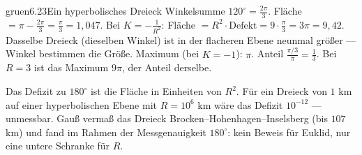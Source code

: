 \begin{loesungkarte}{gruen}{6.23}{Ein hyperbolisches Dreieck}
Winkelsumme $120^{\circ} = \frac{2\pi}3$. Fläche $= \pi - \frac{2\pi}3 = \frac\pi3 = 1{,}047$.
Bei $K = -\frac1{R^{2}}$: Fläche $= R^{2}\cdot\text{Defekt} = 9\cdot\frac\pi3 = 3\pi = 9{,}42$. Dasselbe Dreieck (dieselben Winkel) ist in der flacheren Ebene neunmal größer --- Winkel bestimmen die Größe.
Maximum (bei $K = -1$): $\pi$. Anteil $\frac{\pi/3}\pi = \frac13$. Bei $R = 3$ ist das Maximum $9\pi$, der Anteil derselbe.
\begin{mitnehmen}\kastentext
Das Defizit zu $180^{\circ}$ ist die Fläche in Einheiten von $R^{2}$. Für ein Dreieck von $1$ km auf einer hyperbolischen Ebene mit $R = 10^{6}$ km wäre das Defizit $10^{-12}$ --- unmessbar. Gauß vermaß das Dreieck Brocken--Hohenhagen--Inselsberg (bis $107$ km) und fand im Rahmen der Messgenauigkeit $180^{\circ}$: kein Beweis für Euklid, nur eine untere Schranke für $R$.
\end{mitnehmen}
\end{loesungkarte}

